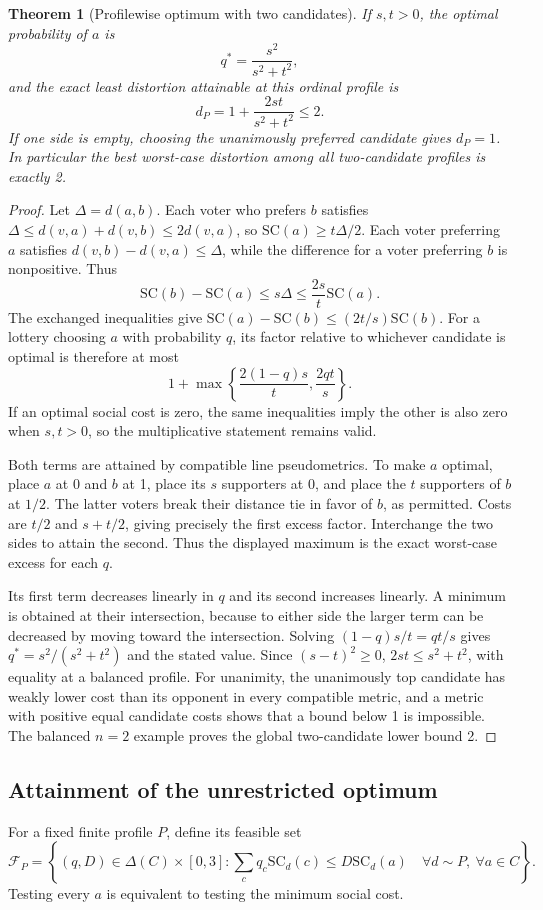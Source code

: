 \documentclass[11pt,a4paper]{article}
\newtheorem{theorem}{Theorem}[section]
\theoremstyle{definition}
\theoremstyle{remark}
\begin{document}
\begin{theorem}[Profilewise optimum with two candidates]
If $s,t>0$, the optimal probability of $a$ is
\[
 q^*=\frac{s^2}{s^2+t^2},
\]
and the exact least distortion attainable at this ordinal profile is
\[
 d_P=1+\frac{2st}{s^2+t^2}\leq2.
\]
If one side is empty, choosing the unanimously preferred candidate gives $d_P=1$. In particular the best worst-case distortion among all two-candidate profiles is exactly 2.
\end{theorem}
\begin{proof}
Let $\Delta=d(a,b)$. Each voter who prefers $b$ satisfies
$\Delta\leq d(v,a)+d(v,b)\leq2d(v,a)$, so $\mathrm{SC}(a)\geq t\Delta/2$. Each voter preferring $a$ satisfies $d(v,b)-d(v,a)\leq\Delta$, while the difference for a voter preferring $b$ is nonpositive. Thus
\[
 \mathrm{SC}(b)-\mathrm{SC}(a)\leq s\Delta
 \leq\frac{2s}{t}\mathrm{SC}(a).
\]
The exchanged inequalities give
$\mathrm{SC}(a)-\mathrm{SC}(b)\leq(2t/s)\mathrm{SC}(b)$.
For a lottery choosing $a$ with probability $q$, its factor relative to whichever candidate is optimal is therefore at most
\[
 1+\max\left\{\frac{2(1-q)s}{t},\frac{2qt}{s}\right\}.
\]
If an optimal social cost is zero, the same inequalities imply the other is also zero when $s,t>0$, so the multiplicative statement remains valid.

Both terms are attained by compatible line pseudometrics. To make $a$ optimal, place $a$ at 0 and $b$ at 1, place its $s$ supporters at 0, and place the $t$ supporters of $b$ at $1/2$. The latter voters break their distance tie in favor of $b$, as permitted. Costs are $t/2$ and $s+t/2$, giving precisely the first excess factor. Interchange the two sides to attain the second. Thus the displayed maximum is the exact worst-case excess for each $q$.

Its first term decreases linearly in $q$ and its second increases linearly. A minimum is obtained at their intersection, because to either side the larger term can be decreased by moving toward the intersection. Solving $(1-q)s/t=qt/s$ gives $q^*=s^2/(s^2+t^2)$ and the stated value. Since $(s-t)^2\geq0$, $2st\leq s^2+t^2$, with equality at a balanced profile. For unanimity, the unanimously top candidate has weakly lower cost than its opponent in every compatible metric, and a metric with positive equal candidate costs shows that a bound below 1 is impossible. The balanced $n=2$ example proves the global two-candidate lower bound 2.
\end{proof}

\subsection{Attainment of the unrestricted optimum}
For a fixed finite profile $P$, define its feasible set
\[
 \mathcal F_P=\left\{(q,D)\in\Delta(C)\times[0,3]:
 \sum_cq_c\mathrm{SC}_d(c)\leq D\mathrm{SC}_d(a)
 \quad\forall d\sim P,\ \forall a\in C\right\}.
\]
Testing every $a$ is equivalent to testing the minimum social cost.
\end{document}
